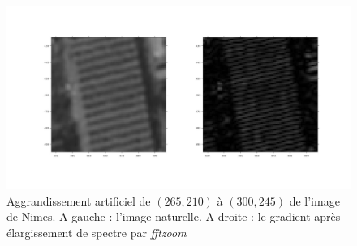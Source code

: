\documentclass[12pt,a4paper,onecolumn]{article}
\begin{document}
\begin{figure}[H]
\begin{center}
	\includegraphics[width = \textwidth]{ex5_q3_solution.jpg}
\end{center}
\caption{Aggrandissement artificiel de $(265, 210)$ à $(300, 245)$ de l'image de Nimes. A gauche : l'image naturelle. A droite : le gradient après élargissement de spectre par \textit{fftzoom}}
\label{ex5_q3_sol}
\end{figure}
\end{document}
